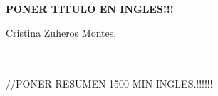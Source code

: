  
\cleardoublepage


\thispagestyle{empty}

\begin{center}
{\large\bfseries PONER TITULO EN INGLES!!!}\\
\end{center}
\begin{center}
Cristina Zuheros Montes.\\
\end{center}

\\

\vspace{0.7cm}
\\

//PONER RESUMEN 1500 MIN INGLES.!!!!!!\\





